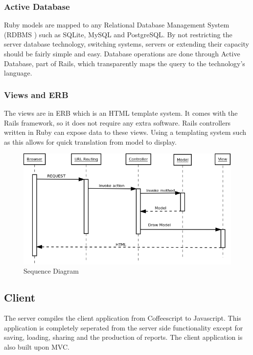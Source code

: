 \documentclass{report}
\begin{document}
				\subsubsection{Active Database}
					Ruby models are mapped to any Relational Database Management System (RDBMS \cite{rdbms}) such as SQLite, MySQL and PostgreSQL. By not restricting the server database technology, switching systems, servers or extending their capacity should be fairly simple and easy. Database operations are done through Active Database, part of Rails, which transparently maps the query to the technology's language.
					
				\subsubsection{Views and ERB} 
					The views are in ERB\cite{erb} which is an HTML template system. It comes with the Rails framework, so it does not require any extra software. Rails controllers written in Ruby can expose data to these views. Using a templating system such as this allows for quick translation from model to display. 
			\begin{figure}[h!]
				\begin{center}
				\includegraphics[width=\linewidth]{SequenceDiagramLife.png}
				\caption{Sequence Diagram}
				\label{fig: SequenceDiagram}
				\end{center}
				\end{figure}	
			\clearpage

			\subsection{Client}
				The server compiles the client application from Coffeescript to Javascript. This application is completely seperated from the server side functionality except for saving, loading, sharing and the production of reports. The client application is also built upon MVC.
				
\end{document}
